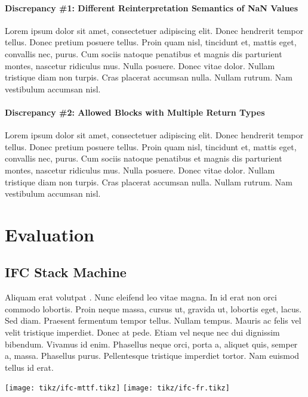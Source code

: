 \documentclass[acmsmall, anonymous]{acmart}
\begin{document}
\paragraph{Discrepancy \#1: Different Reinterpretation Semantics of NaN Values}
Lorem ipsum dolor sit amet, consectetuer adipiscing elit. Donec hendrerit tempor
tellus. Donec pretium posuere tellus. Proin quam nisl, tincidunt et, mattis
eget, convallis nec, purus. Cum sociis natoque penatibus et magnis dis
parturient montes, nascetur ridiculus mus. Nulla posuere. Donec vitae dolor.
Nullam tristique diam non turpis. Cras placerat accumsan nulla. Nullam rutrum.
Nam vestibulum accumsan nisl.

\paragraph{Discrepancy \#2: Allowed Blocks with Multiple Return Types}
Lorem ipsum dolor sit amet, consectetuer adipiscing elit. Donec hendrerit tempor
tellus. Donec pretium posuere tellus. Proin quam nisl, tincidunt et, mattis
eget, convallis nec, purus. Cum sociis natoque penatibus et magnis dis
parturient montes, nascetur ridiculus mus. Nulla posuere. Donec vitae dolor.
Nullam tristique diam non turpis. Cras placerat accumsan nulla. Nullam rutrum.
Nam vestibulum accumsan nisl.

\section{Evaluation}
\label{sec:evaluation}

\subsection{IFC Stack Machine}

Aliquam erat volutpat \citep{devai2013edsl}. Nunc eleifend leo vitae magna. In
id erat non orci commodo lobortis. Proin neque massa, cursus ut, gravida ut,
lobortis eget, lacus. Sed diam. Praesent fermentum tempor tellus. Nullam tempus.
Mauris ac felis vel velit tristique imperdiet. Donec at pede. Etiam vel neque
nec dui dignissim bibendum. Vivamus id enim. Phasellus neque orci, porta a,
aliquet quis, semper a, massa. Phasellus purus. Pellentesque tristique imperdiet
tortor. Nam euismod tellus id erat.

\begin{center}
  \texttt{[image: tikz/ifc-mttf.tikz]}
  \texttt{[image: tikz/ifc-fr.tikz]}
\end{center}
\end{document}
